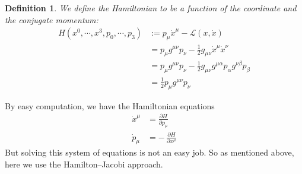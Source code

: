 \documentclass{article}
\newtheorem{definition}{Definition}[section]
\theoremstyle{remark}
\begin{document}
\begin{definition}
    We define the Hamiltonian to be a function of the coordinate and the conjugate momentum:
    \begin{align}
        H(x^0,\cdots,x^3,p_0,\cdots,p_3) &:= p_{\mu}\dot{x}^{\mu}-\mathcal{L}(x,\dot{x})\label{eq:legendre}\\
        &= p_{\mu}g^{\mu\nu}p_{\nu} - \frac{1}{2}g_{\mu\nu}\dot{x}^{\mu}\dot{x}^{\nu}\\
        &= p_{\mu}g^{\mu\nu}p_{\nu} - \frac{1}{2}g_{\mu\nu}g^{\mu\alpha}p_{\alpha}g^{\nu\beta}p_{\beta}\\
        &= \frac{1}{2}p_{\mu}g^{\mu\nu}p_{\nu}
    \end{align}
\end{definition}
By easy computation, we have the Hamiltonian equations
\begin{align}
\dot{x}^\mu &= \frac{\partial H}{\partial p_\mu}\label{eq:hamilton-x}\\
\dot{p}_\mu &= -\,\frac{\partial H}{\partial x^\mu}\label{eq:hamilton-p}
\end{align}
But solving this system of equations is not an easy job. So as mentioned above, here we use the Hamilton--Jacobi approach.
\end{document}
